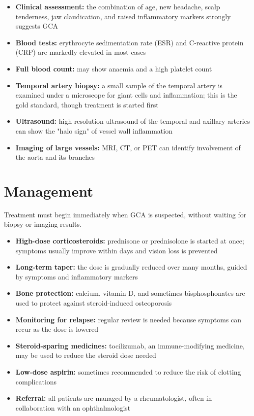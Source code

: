 \begin{itemize}
    \item \textbf{Clinical assessment:} the combination of age, new headache, scalp tenderness, jaw claudication, and raised inflammatory markers strongly suggests GCA
    \item \textbf{Blood tests:} erythrocyte sedimentation rate (ESR) and C-reactive protein (CRP) are markedly elevated in most cases
    \item \textbf{Full blood count:} may show anaemia and a high platelet count
    \item \textbf{Temporal artery biopsy:} a small sample of the temporal artery is examined under a microscope for giant cells and inflammation; this is the gold standard, though treatment is started first
    \item \textbf{Ultrasound:} high-resolution ultrasound of the temporal and axillary arteries can show the "halo sign" of vessel wall inflammation
    \item \textbf{Imaging of large vessels:} MRI, CT, or PET can identify involvement of the aorta and its branches
\end{itemize}

\section*{Management}
Treatment must begin immediately when GCA is suspected, without waiting for biopsy or imaging results.

\begin{itemize}
    \item \textbf{High-dose corticosteroids:} prednisone or prednisolone is started at once; symptoms usually improve within days and vision loss is prevented
    \item \textbf{Long-term taper:} the dose is gradually reduced over many months, guided by symptoms and inflammatory markers
    \item \textbf{Bone protection:} calcium, vitamin D, and sometimes bisphosphonates are used to protect against steroid-induced osteoporosis
    \item \textbf{Monitoring for relapse:} regular review is needed because symptoms can recur as the dose is lowered
    \item \textbf{Steroid-sparing medicines:} tocilizumab, an immune-modifying medicine, may be used to reduce the steroid dose needed
    \item \textbf{Low-dose aspirin:} sometimes recommended to reduce the risk of clotting complications
    \item \textbf{Referral:} all patients are managed by a rheumatologist, often in collaboration with an ophthalmologist
\end{itemize}

